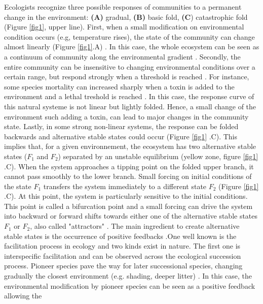 Ecologists recognize three possible responses of communities to a permanent
change in the environment: \textbf{(A)} gradual, \textbf{(B)} basic fold,
\textbf{(C}) catastrophic fold \cite{Scheffer2001} (Figure \ref{fig1}, upper
line). First, when a small modification on environmental condition occurs (e.g,
temperature rises), the state of the community can change almost linearly
(Figure \ref{fig1}.A) \cite{Scheffer2001,Scheffer2009}. In this case, the whole
ecosystem can be seen as a continuum of community along the environmental
gradient \cite{Scheffer2001,Scheffer2009,scheffer2009critical}. Secondly, the
entire community can be insensitive to changing environmental conditions over a
certain range, but respond strongly when a threshold is reached
\cite{scheffer2009critical}. For instance, some species mortality can increased
sharply when a toxin is added to the environment and a lethal treshold is
reached \cite{scheffer2009critical}. In this case, the response curve of this
natural systeme is not linear but lightly folded. Hence, a small change of the
environment such adding a toxin, can lead to major changes in the  community
state. Lastly, in some strong non-linear systems, the response can be folded
backwards and alternative stable states could occur (Figure \ref{fig1} .C). This
implies that, for a given environnement, the ecosystem has two alternative
stable states ($F_1$ and $F_2$) separated by an unstable equilibrium (yellow
zone, figure \ref{fig1} .C). When the system approaches a tipping point on the
folded upper branch, it cannot pass smoothly to the lower branch. Small forcing
on initial conditions of the state $F_1$ transfers the system immediately to a
different state $F_2$ (Figure \ref{fig1} .C). At this point, the system is
particularly sensitive to the initial conditions. This point is called a
bifurcation point and a small forcing can drive the system into backward or
forward shifts towards either one of the alternative stable states $F_1$ or
$F_2$, also called "attractors" \cite{scheffer2009critical}. The main ingredient
to create alternative stable states is the occurrence of positive feedbacks
\cite{scheffer2009critical,Schroder2005}.One well known is the facilitation
process in ecology and two kinds exist in nature. The first one is interspecific
facilitation and can be observed across the ecological succession process.
Pioneer species pave the way for later successional species, changing gradually
the closest environment (e.g. shading, deeper litter)
\cite{scheffer2009critical, Levine2006}. In this case, the environmental
modification by pioneer species can be seen as a positive feedback allowing the
